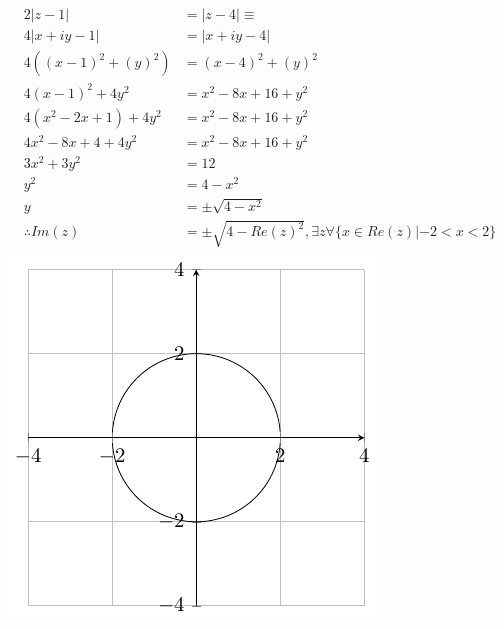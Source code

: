 \documentclass{myassignment}
\begin{document}
	\begin{answer}
		\begin{multicols}{2}
			\begin{align*}
				2|z-1| &= |z-4| \equiv \\[2em]
				4|x+iy-1| &= |x+iy-4|\\[1em]
				4((x-1)^2+(y)^2) &= (x-4)^2+(y)^2 \\[1em]
				4(x-1)^2+4y^2 &= x^2-8x+16+y^2 \\[1em]
				4(x^2-2x+1)+4y^2 &= x^2-8x+16+y^2 \\[1em]
				4x^2-8x+4 + 4y^2 &= x^2-8x+16+y^2 \\[1em]
				3x^2 + 3y^2 &= 12 \\[1em]
				y^2 &= 4 - x^2 \\[1em]
				y &= \pm \sqrt{4 - x^2}\\[1em]
				\therefore Im(z) &= \pm\sqrt{4 - Re(z)^2}, \exists z \forall \{x \in Re(z) | -2 < x <2 \} \\[1em]
			\end{align*}
		\columnbreak
		\includegraphics{graphact4}

		\end{multicols}
	\end{answer}
\end{document}
